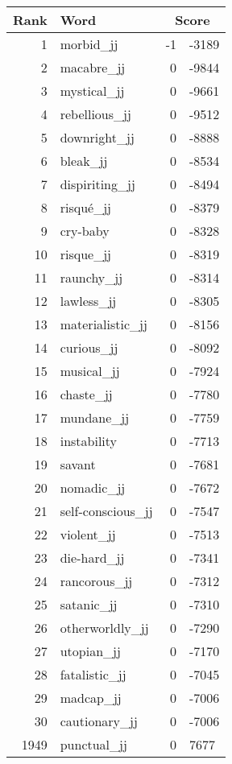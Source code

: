 \begin{longtable}[!htbp]{| rlr@{.}l |}
    \hline
    \textbf{Rank} & \textbf{Word} & \multicolumn{2}{c|}{\textbf{Score}} \\
    \hline
    \endhead
    1 & morbid\_jj & -1 & -3189 \\
    2 & macabre\_jj & 0 & -9844 \\
    3 & mystical\_jj & 0 & -9661 \\
    4 & rebellious\_jj & 0 & -9512 \\
    5 & downright\_jj & 0 & -8888 \\
    6 & bleak\_jj & 0 & -8534 \\
    7 & dispiriting\_jj & 0 & -8494 \\
    8 & risqué\_jj & 0 & -8379 \\
    9 & cry-baby & 0 & -8328 \\
    10 & risque\_jj & 0 & -8319 \\
    11 & raunchy\_jj & 0 & -8314 \\
    12 & lawless\_jj & 0 & -8305 \\
    13 & materialistic\_jj & 0 & -8156 \\
    14 & curious\_jj & 0 & -8092 \\
    15 & musical\_jj & 0 & -7924 \\
    16 & chaste\_jj & 0 & -7780 \\
    17 & mundane\_jj & 0 & -7759 \\
    18 & instability & 0 & -7713 \\
    19 & savant & 0 & -7681 \\
    20 & nomadic\_jj & 0 & -7672 \\
    21 & self-conscious\_jj & 0 & -7547 \\
    22 & violent\_jj & 0 & -7513 \\
    23 & die-hard\_jj & 0 & -7341 \\
    24 & rancorous\_jj & 0 & -7312 \\
    25 & satanic\_jj & 0 & -7310 \\
    26 & otherworldly\_jj & 0 & -7290 \\
    27 & utopian\_jj & 0 & -7170 \\
    28 & fatalistic\_jj & 0 & -7045 \\
    29 & madcap\_jj & 0 & -7006 \\
    30 & cautionary\_jj & 0 & -7006 \\
    1949 & punctual\_jj & 0 & 7677 \\

\end{longtable}
